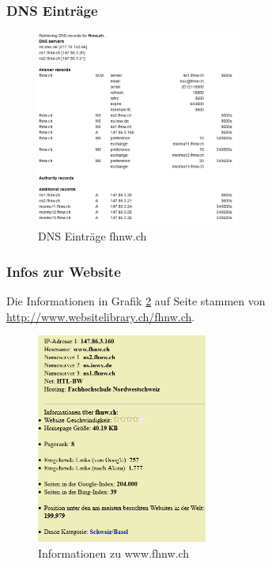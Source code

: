 \documentclass[11pt,a4paper]{scrartcl}
\begin{document}
\subsubsection{DNS Einträge}
\begin{figure}[p]
	\centering
	\includegraphics[width=0.6\textwidth]{../aufg5/dns_records.png}
	\caption{DNS Einträge fhnw.ch}
	\label{fig:dns_records}
\end{figure}

\subsubsection{Infos zur Website}
Die Informationen in Grafik \ref{fig:website_infos} auf Seite \pageref{fig:website_infos} stammen von \url{http://www.websitelibrary.ch/fhnw.ch}.
\begin{figure}[p]
	\centering
	\includegraphics[width=0.5\textwidth]{../aufg5/website_infos.png}
	\caption{Informationen zu www.fhnw.ch}
	\label{fig:website_infos}
\end{figure}
\end{document}
